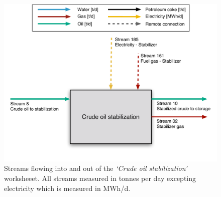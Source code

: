\documentclass[11pt]{report}
\newcommand{\sheet}[1]{\textit{`{#1}'}}
\begin{document}
\begin{figure}
\includegraphics[width=0.85\columnwidth]{images/Crude_oil_stabilization_PF.pdf}
\caption{Streams flowing into and out of the \sheet{Crude oil stabilization} worksheeet. All streams measured in tonnes per day excepting electricity which is measured in MWh/d.}
\label{fig:crude_oil_stabilization_PF}
\end{figure}
\end{document}
